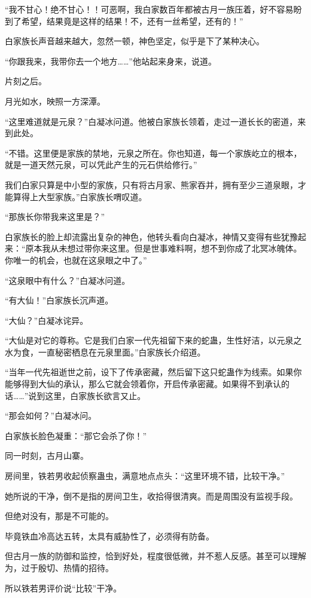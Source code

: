 \begin{this_body}
“我不甘心！绝不甘心！！可恶啊，我白家数百年都被古月一族压着，好不容易盼到了希望，结果竟是这样的结果！不，还有一丝希望，还有的！”

白家族长声音越来越大，忽然一顿，神色坚定，似乎是下了某种决心。

“你跟我来，我带你去一个地方……”他站起来身来，说道。

片刻之后。

月光如水，映照一方深潭。

“这里难道就是元泉？”白凝冰问道。他被白家族长领着，走过一道长长的密道，来到此处。

“不错。这里便是家族的禁地，元泉之所在。你也知道，每一个家族屹立的根本，就是一道天然元泉，可以凭此产生的元石供给修行。”

我们白家只算是中小型的家族，只有将古月家、熊家吞并，拥有至少三道泉眼，才能算得上大型家族。”白家族长喟叹道。

“那族长你带我来这里是？”

白家族长的脸上却流露出复杂的神色，他转头看向白凝冰，神情又变得有些犹豫起来：“原本我从未想过带你来这里。但是世事难料啊，想不到你成了北冥冰魄体。你唯一的机会，也就在这泉眼之中了。”

“这泉眼中有什么？”白凝冰问道。

“有大仙！”白家族长沉声道。

“大仙？”白凝冰诧异。

“大仙是对它的尊称。它是我们白家一代先祖留下来的蛇蛊，生性好洁，以元泉之水为食，一直秘密栖息在元泉里面。”白家族长介绍道。

“当年一代先祖逝世之前，设下了传承密藏，然后留下这只蛇蛊作为线索。如果你能够得到大仙的承认，那么它就会领着你，开启传承密藏。如果得不到承认的话……”说到这里，白家族长欲言又止。

“那会如何？”白凝冰问。

白家族长脸色凝重：“那它会杀了你！”

同一时刻，古月山寨。

房间里，铁若男收起侦察蛊虫，满意地点点头：“这里环境不错，比较干净。”

她所说的干净，倒不是指的房间卫生，收拾得很清爽。而是周围没有监视手段。

但绝对没有，那是不可能的。

毕竟铁血冷高达五转，太具有威胁性了，必须得有防备。

但古月一族的防御和监控，恰到好处，程度很低微，并不惹人反感。甚至可以理解为，过于殷切、热情的招待。

所以铁若男评价说“比较”干净。


\end{this_body}
